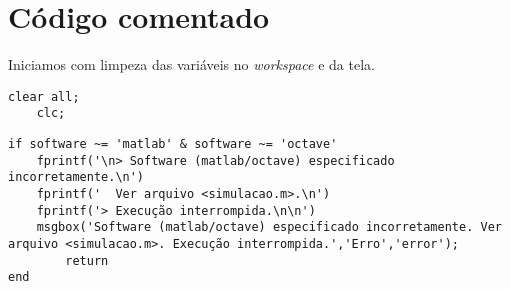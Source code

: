 \chapter{C\'odigo comentado}

Iniciamos com limpeza das variáveis no \textit{workspace} e da tela.

\begin{verbatim}
clear all;
    clc;
\end{verbatim}

\begin{verbatim}
if software ~= 'matlab' & software ~= 'octave'
	fprintf('\n> Software (matlab/octave) especificado incorretamente.\n')
    fprintf('  Ver arquivo <simulacao.m>.\n')
    fprintf('> Execução interrompida.\n\n')
    msgbox('Software (matlab/octave) especificado incorretamente. Ver arquivo <simulacao.m>. Execução interrompida.','Erro','error');
        return
end

\end{verbatim}